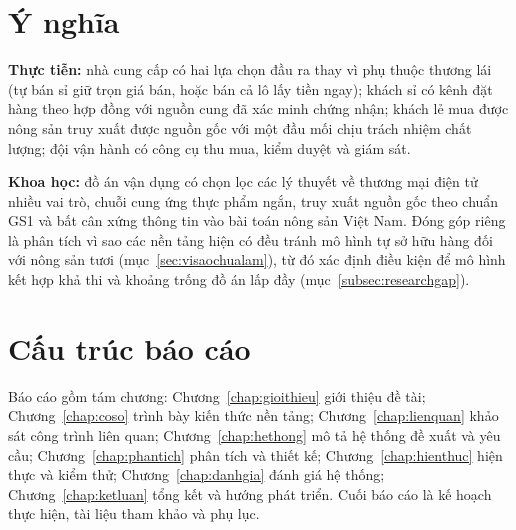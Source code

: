 \section{Ý nghĩa}
\label{sec:ynghia}

\textbf{Thực tiễn:} nhà cung cấp có hai lựa chọn đầu ra thay vì phụ thuộc thương lái (tự bán sỉ giữ trọn giá bán, hoặc bán cả lô lấy tiền ngay); khách sỉ có kênh đặt hàng theo hợp đồng với nguồn cung đã xác minh chứng nhận; khách lẻ mua được nông sản truy xuất được nguồn gốc với một đầu mối chịu trách nhiệm chất lượng; đội vận hành có công cụ thu mua, kiểm duyệt và giám sát.

\textbf{Khoa học:} đồ án vận dụng có chọn lọc các lý thuyết về thương mại điện tử nhiều vai trò, chuỗi cung ứng thực phẩm ngắn, truy xuất nguồn gốc theo chuẩn GS1 và bất cân xứng thông tin vào bài toán nông sản Việt Nam. Đóng góp riêng là phân tích vì sao các nền tảng hiện có đều tránh mô hình tự sở hữu hàng đối với nông sản tươi (mục~\ref{sec:visaochualam}), từ đó xác định điều kiện để mô hình kết hợp khả thi và khoảng trống đồ án lấp đầy (mục~\ref{subsec:researchgap}).

\section{Cấu trúc báo cáo}

Báo cáo gồm tám chương: Chương~\ref{chap:gioithieu} giới thiệu đề tài; Chương~\ref{chap:coso} trình bày kiến thức nền tảng; Chương~\ref{chap:lienquan} khảo sát công trình liên quan; Chương~\ref{chap:hethong} mô tả hệ thống đề xuất và yêu cầu; Chương~\ref{chap:phantich} phân tích và thiết kế; Chương~\ref{chap:hienthuc} hiện thực và kiểm thử; Chương~\ref{chap:danhgia} đánh giá hệ thống; Chương~\ref{chap:ketluan} tổng kết và hướng phát triển. Cuối báo cáo là kế hoạch thực hiện, tài liệu tham khảo và phụ lục.
